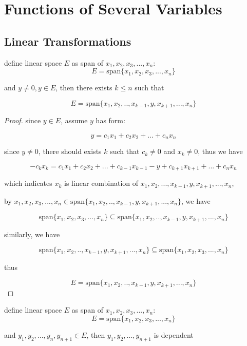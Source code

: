 \section{Functions of Several Variables}

\subsection{Linear Transformations}

\begin{thm}
    \label{daca0235-3fc5-4b2f-ade5-e47efb134cfc}
define linear space $E$ as span of $x_1,x_2,x_3,...,x_n$:
    \[
        E = \mathrm{span} \{ x_1,x_2,x_3,...,x_n\}
    \]

    and $y \ne 0, y \in E$, then there exists $k \le n$ such that

    \[
        E = \mathrm{span} \{ x_1,x_2,..,x_{k-1},y,x_{k+1},...,x_n\}
    \]
\end{thm}

\begin{proof}
    since $y \in E$, assume $y$ has form:

    \[
        y=c_1x_1 + c_2x_2+...+c_nx_n
    \]

    since $y \ne 0$, there should exists $k$ such that $c_k \ne 0$ and $x_k \ne 0$, thus we have

    \[
        -c_kx_k = c_1x_1 + c_2x_2+ ... + c_{k-1}x_{k-1} -y + c_{k+1}x_{k+1}+...+c_nx_n
    \]

    which indicates $x_k$ is linear combination of $x_1,x_2,...,x_{k-1},y,x_{k+1},...,x_n$,

    by $x_1,x_2,x_3,...,x_n \in \mathrm{span} \{ x_1,x_2,..,x_{k-1},y,x_{k+1},...,x_n\}$, we have

    \[
 \mathrm{span} \{ x_1,x_2,x_3,...,x_n\}       \subseteq \mathrm{span} \{ x_1,x_2,..,x_{k-1},y,x_{k+1},...,x_n\}
    \]

    similarly, we have

    \[
 \mathrm{span} \{ x_1,x_2,..,x_{k-1},y,x_{k+1},...,x_n\} \subseteq \mathrm{span} \{ x_1,x_2,x_3,...,x_n\}
    \]

    thus

    \[
        E = \mathrm{span} \{ x_1,x_2,..,x_{k-1},y,x_{k+1},...,x_n\}
    \]
\end{proof}

\begin{thm}
define linear space $E$ as span of $x_1,x_2,x_3,...,x_n$:
    \[
        E = \mathrm{span} \{ x_1,x_2,x_3,...,x_n\}
    \]

    and $y_1,y_2,...,y_{n},y_{n+1} \in E$, then $y_1,y_2,...,y_{n+1}$ is dependent

\end{thm}

